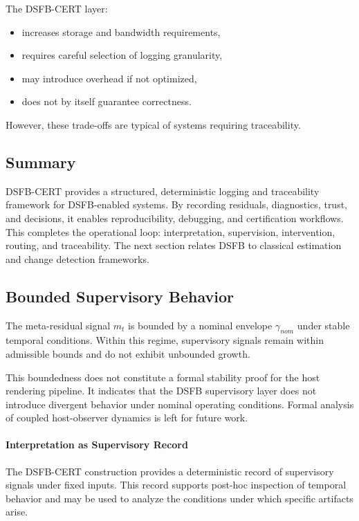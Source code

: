 \documentclass[11pt,letterpaper]{article}
\theoremstyle{gcresult}
\theoremstyle{definition}
\begin{document}
The DSFB-CERT layer:
\begin{itemize}[leftmargin=1.5em]
    \item increases storage and bandwidth requirements,
    \item requires careful selection of logging granularity,
    \item may introduce overhead if not optimized,
    \item does not by itself guarantee correctness.
\end{itemize}

However, these trade-offs are typical of systems requiring traceability.


\subsection{Summary}

DSFB-CERT provides a structured, deterministic logging and traceability framework for DSFB-enabled systems. By recording residuals, diagnostics, trust, and decisions, it enables reproducibility, debugging, and certification workflows. This completes the operational loop: interpretation, supervision, intervention, routing, and traceability. The next section relates DSFB to classical estimation and change detection frameworks.


\subsection{Bounded Supervisory Behavior}

The meta-residual signal $m_t$ is bounded by a nominal envelope $\gamma_{nom}$ under stable temporal conditions. Within this regime, supervisory signals remain within admissible bounds and do not exhibit unbounded growth.

This boundedness does not constitute a formal stability proof for the host rendering pipeline. It indicates that the DSFB supervisory layer does not introduce divergent behavior under nominal operating conditions. Formal analysis of coupled host-observer dynamics is left for future work.

\paragraph{Interpretation as Supervisory Record}

The DSFB-CERT construction provides a deterministic record of supervisory signals under fixed inputs. This record supports post-hoc inspection of temporal behavior and may be used to analyze the conditions under which specific artifacts arise.
\end{document}

